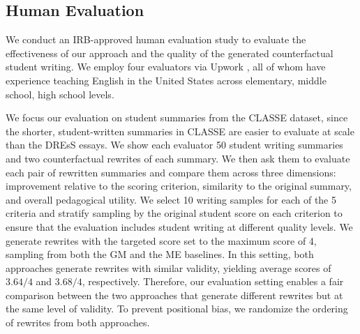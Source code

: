 \documentclass[11pt]{article}
\begin{document}
\subsection{Human Evaluation}



We conduct an IRB-approved human evaluation study to evaluate the effectiveness of our approach and the quality of the generated counterfactual student writing. We employ four evaluators via Upwork \cite{upwork}, all of whom have experience teaching English in the United States across elementary, middle school, high school levels.

We focus our evaluation on student summaries from the CLASSE dataset, since the shorter, student-written summaries in CLASSE are easier to evaluate at scale than the DREsS essays. We show each evaluator 50 student writing summaries and two counterfactual rewrites of each summary. We then ask them to evaluate each pair of rewritten summaries and compare them across three dimensions: improvement relative to the scoring criterion, similarity to the original summary, and overall pedagogical utility. We select 10 writing samples for each of the 5 criteria and stratify sampling by the original student score on each criterion to ensure that the evaluation includes student writing at different quality levels. We generate rewrites with the targeted score set to the maximum score of 4, sampling from both the GM and the ME baselines. In this setting, both approaches generate rewrites with similar validity, yielding average scores of $3.64/4$ and $3.68/4$, respectively. Therefore, our evaluation setting enables a fair comparison between the two approaches that generate different rewrites but at the same level of validity. To prevent positional bias, we randomize the ordering of rewrites from both approaches.
\end{document}

